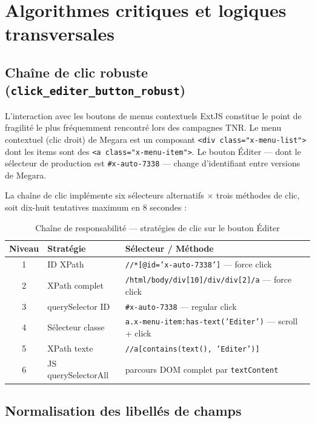\documentclass[12pt, a4paper]{report}
\begin{document}
\section{Algorithmes critiques et logiques transversales}

\subsection{Chaîne de clic robuste (\texttt{click\_editer\_button\_robust})}

L'interaction avec les boutons de menus contextuels ExtJS constitue le point de fragilité le plus fréquemment rencontré lors des campagnes TNR. Le menu contextuel (clic droit) de Megara est un composant \texttt{<div class="x-menu-list">} dont les items sont des \texttt{<a class="x-menu-item">}. Le bouton \og{}Éditer\fg{} — dont le sélecteur de production est \texttt{\#x-auto-7338} — change d'identifiant entre versions de Megara.

La chaîne de clic implémente six sélecteurs alternatifs × trois méthodes de clic, soit dix-huit tentatives maximum en 8 secondes :

\begin{table}[H]
\centering
\caption{Chaîne de responsabilité — stratégies de clic sur le bouton Éditer}
\label{tab:clickchain}
\begin{tabularx}{\textwidth}{clX}
\toprule
\textbf{Niveau} & \textbf{Stratégie} & \textbf{Sélecteur / Méthode} \\
\midrule
1 & ID XPath          & \texttt{//*[@id='x-auto-7338']} — force click \\
2 & XPath complet     & \texttt{/html/body/div[10]/div/div[2]/a} — force click \\
3 & querySelector ID  & \texttt{\#x-auto-7338} — regular click \\
4 & Sélecteur classe  & \texttt{a.x-menu-item:has-text('Editer')} — scroll + click \\
5 & XPath texte       & \texttt{//a[contains(text(), 'Editer')]} \\
6 & JS querySelectorAll & parcours DOM complet par \texttt{textContent} \\
\bottomrule
\end{tabularx}
\end{table}

\subsection{Normalisation des libellés de champs}
\end{document}
